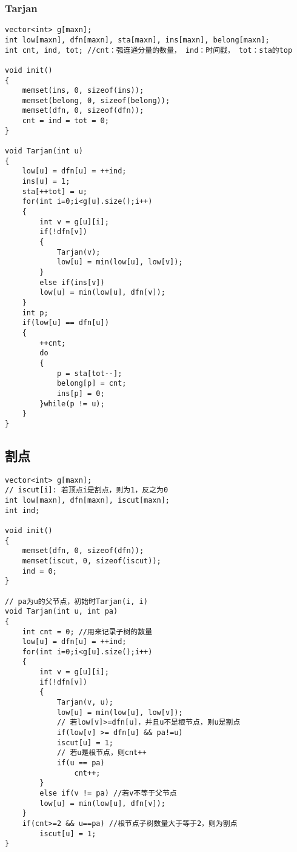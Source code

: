 \subsubsection{Tarjan}
\begin{lstlisting}
vector<int> g[maxn];
int low[maxn], dfn[maxn], sta[maxn], ins[maxn], belong[maxn];
int cnt, ind, tot; //cnt：强连通分量的数量， ind：时间戳， tot：sta的top

void init()
{
	memset(ins, 0, sizeof(ins));
	memset(belong, 0, sizeof(belong));
	memset(dfn, 0, sizeof(dfn));
	cnt = ind = tot = 0;
}

void Tarjan(int u)
{
	low[u] = dfn[u] = ++ind;
	ins[u] = 1;
	sta[++tot] = u;
	for(int i=0;i<g[u].size();i++)
	{
		int v = g[u][i];
		if(!dfn[v])
		{
			Tarjan(v);
			low[u] = min(low[u], low[v]);
		}
		else if(ins[v])
		low[u] = min(low[u], dfn[v]);
	}
	int p;
	if(low[u] == dfn[u])
	{
		++cnt;
		do
		{
			p = sta[tot--];
			belong[p] = cnt;
			ins[p] = 0;
		}while(p != u);
	}
}
\end{lstlisting}

\subsection{割点}
\begin{lstlisting}
vector<int> g[maxn];
// iscut[i]: 若顶点i是割点，则为1，反之为0
int low[maxn], dfn[maxn], iscut[maxn];
int ind;

void init()
{
	memset(dfn, 0, sizeof(dfn));
	memset(iscut, 0, sizeof(iscut));
	ind = 0;
}

// pa为u的父节点，初始时Tarjan(i, i)
void Tarjan(int u, int pa)
{
	int cnt = 0; //用来记录子树的数量
	low[u] = dfn[u] = ++ind;
	for(int i=0;i<g[u].size();i++)
	{
		int v = g[u][i];
		if(!dfn[v])
		{
			Tarjan(v, u);
			low[u] = min(low[u], low[v]);
			// 若low[v]>=dfn[u]，并且u不是根节点，则u是割点
			if(low[v] >= dfn[u] && pa!=u)
			iscut[u] = 1;
			// 若u是根节点，则cnt++
			if(u == pa)
				cnt++;
		}
		else if(v != pa) //若v不等于父节点
		low[u] = min(low[u], dfn[v]);
	}
	if(cnt>=2 && u==pa) //根节点子树数量大于等于2，则为割点
		iscut[u] = 1;
}
\end{lstlisting}

